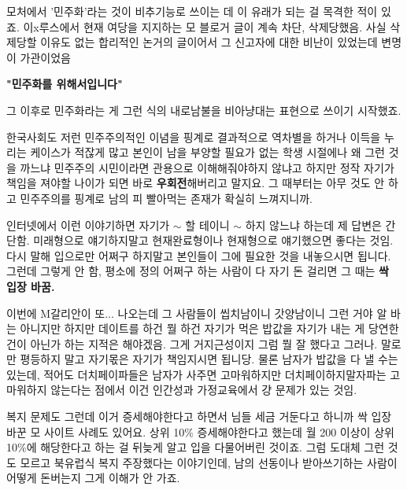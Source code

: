 모처에서 '민주화'라는 것이 비추기능로 쓰이는 데 이 유래가 되는 걸 목격한 적이 있죠.
이x루스에서 현재 여당을 지지하는 모 블로거 글이 계속 차단, 삭제당했음.
사실 삭제당할 이유도 없는 합리적인 논거의 글이어서 그 신고자에 대한 비난이 있었는데 변명이 가관이었음
\vspace{5mm}

\textbf{"민주화를 위해서입니다"}
\vspace{5mm}

그 이후로 민주화라는 게 그런 식의 내로남불을 비아냥대는 표현으로 쓰이기 시작했죠.
\vspace{5mm}

한국사회도 저런 민주주의적인 이념을 핑계로 결과적으로 역차별을 하거나 이득을 누리는 케이스가 적잖게 많고
본인이 남을 부양할 필요가 없는 학생 시절에나 왜 그런 것을 까느냐 민주주의 시민이라면 관용으로 이해해줘야하지 않냐고 하지만
정작 자기가 책임을 져야할 나이가 되면 바로 \textbf{우회전}해버리고 말지요.
그 때부터는 아무 것도 안 하고 민주주의를 핑계로 남의 피 빨아먹는 존재가 확실히 느껴지니까.
\vspace{5mm}

인터넷에서 이런 이야기하면 자기가 $\sim$ 할 테이니 $\sim$ 하지 않느냐 하는데
제 답변은 간단함. 미래형으로 얘기하지말고 현재완료형이나 현재형으로 얘기했으면 좋다는 것임.
다시 말해 입으로만 어쩌구 하지말고 본인들이 그에 필요한 것을 내놓으시면 됩니다.
그런데 그렇게 안 함, 평소에 정의 어쩌구 하는 사람이 다 자기 돈 걸리면 그 때는 \textbf{싹 입장 바꿈.}
\vspace{5mm}

이번에 M갈리안이 또... 나오는데 그 사람들이 씹치남이니 갓양남이니 그런 거야 알 바는 아니지만
하지만 데이트를 하건 뭘 하건 자기가 먹은 밥값을 자기가 내는 게 당연한 건이 아닌가 하는 지적은 해야겠음.
그게 거지근성이지 그럼 뭘 잘 했다고 그러나. 말로만 평등하지 말고 자기몫은 자기가 책임지시면 됩니당.
물론 남자가 밥값을 다 낼 수는 있는데, 적어도 더치페이파들은 남자가 사주면 고마워하지만
더치페이하지말자파는 고마워하지 않는다는 점에서 이건 인간성과 가정교육에서 걍 문제가 있는 것임.
\vspace{5mm}

복지 문제도 그런데 이거 증세해야한다고 하면서 님들 세금 거둔다고 하니까 싹 입장 바꾼 모 사이트 사례도 있어요.
상위 10$\%$ 증세해야한다고 했는데 월 200 이상이 상위 10$\%$에 해당한다고 하는 걸 뒤늦게 알고 입을 다물어버린 것이죠.
그럼 도대체 그런 것도 모르고 북유럽식 복지 주장했다는 이야기인데,
남의 선동이나 받아쓰기하는 사람이 어떻게 돈버는지 그게 이해가 안 가죠.
\vspace{5mm}


